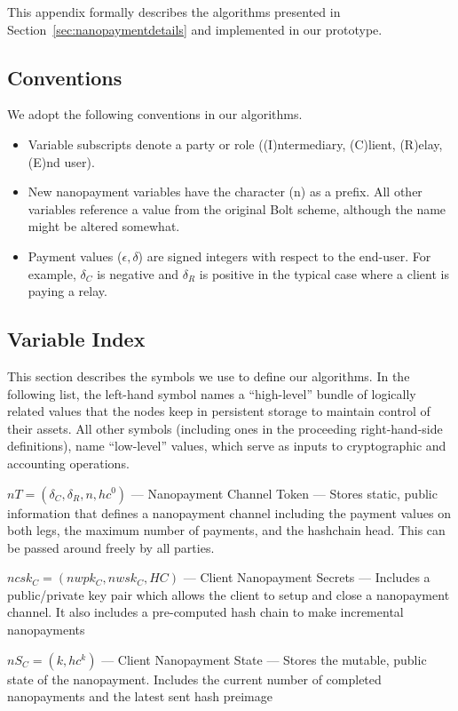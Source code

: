 This appendix formally describes the algorithms presented in Section~\ref{sec:nanopaymentdetails} and implemented in our prototype.

\subsection{Conventions}

We adopt the following conventions in our algorithms.

\begin{itemize}
\item Variable subscripts denote a party or role ((I)ntermediary, (C)lient, (R)elay, (E)nd user).
\item New nanopayment variables have the character (n) as a prefix.
  All other variables reference a value from the original Bolt scheme, although the name might be altered somewhat.
\item Payment values ($\epsilon, \delta$) are signed integers with respect to the end-user.
  For example, $\delta_C$ is negative and $\delta_R$ is positive in the typical case where a client is paying a relay.
\end{itemize}

\subsection{Variable Index}

This section describes the symbols we use to define our algorithms.
In the following list, the left-hand symbol names a ``high-level'' bundle of logically related values that the nodes keep in persistent storage to maintain control of their assets.
All other symbols (including ones in the proceeding right-hand-side definitions), name ``low-level'' values, which serve as inputs to cryptographic and accounting operations.

$nT = (\delta_C, \delta_R, n, hc^0)$ --- Nanopayment Channel Token --- Stores static, public information that defines a nanopayment channel including the payment values on both legs, the maximum number of payments, and the hashchain head.
This can be passed around freely by all parties.

$ncsk_C = (nwpk_C, nwsk_C, HC)$ --- Client Nanopayment Secrets --- Includes a public/private key pair which allows the client to setup and close a nanopayment channel.
It also includes a pre-computed hash chain to make incremental nanopayments

$nS_C = (k, hc^k)$ --- Client Nanopayment State --- Stores the mutable, public state of the nanopayment.
Includes the current number of completed nanopayments and the latest sent hash preimage

